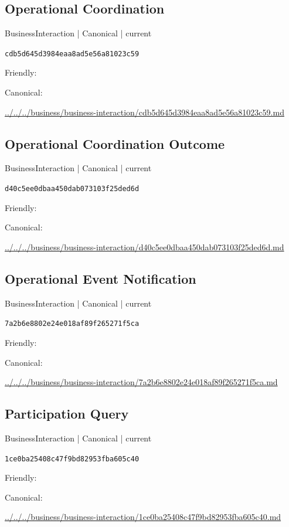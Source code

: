 \documentclass[10pt,a4paper]{article}
\begin{document}
\subsection*{Operational Coordination}
{\small BusinessInteraction | Canonical | current}\par
\texttt{cdb5d645d3984eaa8ad5e56a81023c59}\par
Friendly: \par
Canonical: \par
{\footnotesize\url{../../../business/business-interaction/cdb5d645d3984eaa8ad5e56a81023c59.md}}\par
\subsection*{Operational Coordination Outcome}
{\small BusinessInteraction | Canonical | current}\par
\texttt{d40c5ee0dbaa450dab073103f25ded6d}\par
Friendly: \par
Canonical: \par
{\footnotesize\url{../../../business/business-interaction/d40c5ee0dbaa450dab073103f25ded6d.md}}\par
\subsection*{Operational Event Notification}
{\small BusinessInteraction | Canonical | current}\par
\texttt{7a2b6e8802e24e018af89f265271f5ca}\par
Friendly: \par
Canonical: \par
{\footnotesize\url{../../../business/business-interaction/7a2b6e8802e24e018af89f265271f5ca.md}}\par
\subsection*{Participation Query}
{\small BusinessInteraction | Canonical | current}\par
\texttt{1ce0ba25408c47f9bd82953fba605c40}\par
Friendly: \par
Canonical: \par
{\footnotesize\url{../../../business/business-interaction/1ce0ba25408c47f9bd82953fba605c40.md}}\par
\end{document}
